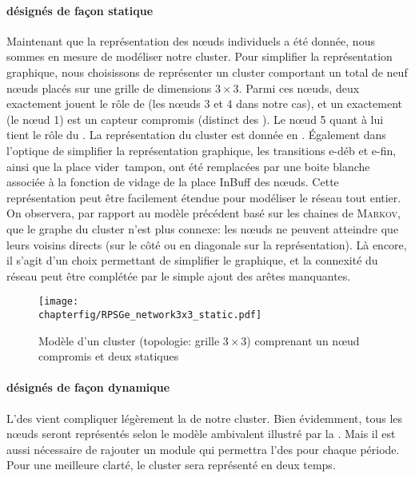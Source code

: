             \paragraph{\cns désignés de façon statique}
Maintenant que la représentation des nœuds individuels a été donnée, nous sommes en mesure de modéliser notre cluster.
Pour simplifier la représentation graphique, nous choisissons de représenter un cluster comportant un total de neuf nœuds placés sur une grille de dimensions $3\times3$.
Parmi ces nœuds, deux exactement jouent le rôle de \cn (les nœuds \textsf{3} et \textsf{4} dans notre cas), et un exactement (le nœud \textsf{1}) est un capteur compromis (distinct des \cns).
Le nœud \textsf{5} quant à lui tient le rôle du \ch.
La représentation du cluster est donnée en .
Également dans l'optique de simplifier la représentation graphique, les transitions \textsf{e-déb} et \textsf{e-fin}, ainsi que la place \textsf{vider~tampon}, ont été remplacées par une boite blanche associée à la fonction de vidage de la place \textsf{InBuff} des nœuds.
Cette représentation peut être facilement étendue pour modéliser le réseau tout entier.
On observera, par rapport au modèle précédent basé sur les chaines de \textsc{Markov}, que le graphe du cluster n'est plus connexe: les nœuds ne peuvent atteindre que leurs voisins directs (sur le côté ou en diagonale sur la représentation).
Là encore, il s'agit d'un choix permettant de simplifier le graphique, et la connexité du réseau peut être complétée par le simple ajout des arêtes manquantes.
\begin{figure}[!ht]
    \centering
    \texttt{[image: \\chapterfig/RPSGe\_network3x3\_static.pdf]}
    \caption{Modèle \rpsge d'un cluster (topologie: grille $3\times3$) comprenant un nœud compromis et deux \cns statiques}\label{sa:fig:petricluster}
\end{figure}

            \paragraph{\cns désignés de façon dynamique}
L'\elecdyn des \cns vient compliquer légèrement la  de notre cluster.
Bien évidemment, tous les nœuds seront représentés selon le modèle ambivalent illustré par la .
Mais il est aussi nécessaire de rajouter un module qui permettra l'\election des \cns pour chaque période.
Pour une meilleure clarté, le cluster sera représenté en deux temps.

